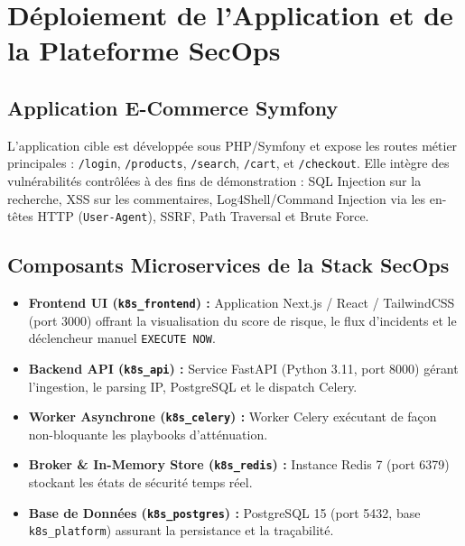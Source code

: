 \documentclass[12pt,a4paper]{report}
\begin{document}
\chapter{Déploiement de l'Application et de la Plateforme SecOps}

\section{Application E-Commerce Symfony}
L'application cible est développée sous PHP/Symfony et expose les routes métier principales : \texttt{/login}, \texttt{/products}, \texttt{/search}, \texttt{/cart}, et \texttt{/checkout}. Elle intègre des vulnérabilités contrôlées à des fins de démonstration : SQL Injection sur la recherche, XSS sur les commentaires, Log4Shell/Command Injection via les en-têtes HTTP (\texttt{User-Agent}), SSRF, Path Traversal et Brute Force.

\section{Composants Microservices de la Stack SecOps}
\begin{itemize}
    \item \textbf{Frontend UI (\texttt{k8s\_frontend}) :} Application Next.js / React / TailwindCSS (port 3000) offrant la visualisation du score de risque, le flux d'incidents et le déclencheur manuel \texttt{EXECUTE NOW}.
    \item \textbf{Backend API (\texttt{k8s\_api}) :} Service FastAPI (Python 3.11, port 8000) gérant l'ingestion, le parsing IP, PostgreSQL et le dispatch Celery.
    \item \textbf{Worker Asynchrone (\texttt{k8s\_celery}) :} Worker Celery exécutant de façon non-bloquante les playbooks d'atténuation.
    \item \textbf{Broker \& In-Memory Store (\texttt{k8s\_redis}) :} Instance Redis 7 (port 6379) stockant les états de sécurité temps réel.
    \item \textbf{Base de Données (\texttt{k8s\_postgres}) :} PostgreSQL 15 (port 5432, base \texttt{k8s\_platform}) assurant la persistance et la traçabilité.
\end{itemize}

\end{document}
